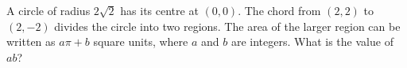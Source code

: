 A circle of radius $2\sqrt2$ has its centre at $(0,0)$. The chord from $(2,2)$ to $(2,-2)$ divides the circle into two regions. The area of the larger region can be written as $a\pi+b$ square units, where $a$ and $b$ are integers. What is the value of $ab$?

